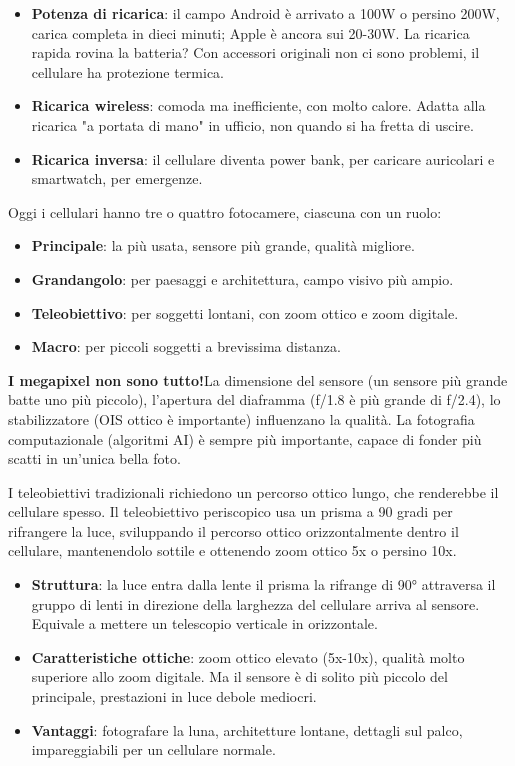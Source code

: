 \begin{itemize}
  \item \textbf{Potenza di ricarica}: il campo Android è arrivato a 100W o persino 200W, carica completa in dieci minuti; Apple è ancora sui 20-30W. La ricarica rapida rovina la batteria? Con accessori originali non ci sono problemi, il cellulare ha protezione termica.
  \item \textbf{Ricarica wireless}: comoda ma inefficiente, con molto calore. Adatta alla ricarica "a portata di mano" in ufficio, non quando si ha fretta di uscire.
  \item \textbf{Ricarica inversa}: il cellulare diventa power bank, per caricare auricolari e smartwatch, per emergenze.
\end{itemize}


Oggi i cellulari hanno tre o quattro fotocamere, ciascuna con un ruolo:

\begin{itemize}
  \item \textbf{Principale}: la più usata, sensore più grande, qualità migliore.
  \item \textbf{Grandangolo}: per paesaggi e architettura, campo visivo più ampio.
  \item \textbf{Teleobiettivo}: per soggetti lontani, con zoom ottico e zoom digitale.
  \item \textbf{Macro}: per piccoli soggetti a brevissima distanza.
\end{itemize}

\textbf{I megapixel non sono tutto!}La dimensione del sensore (un sensore più grande batte uno più piccolo), l'apertura del diaframma (f/1.8 è più grande di f/2.4), lo stabilizzatore (OIS ottico è importante) influenzano la qualità. La fotografia computazionale (algoritmi AI) è sempre più importante, capace di fonder più scatti in un'unica bella foto.


I teleobiettivi tradizionali richiedono un percorso ottico lungo, che renderebbe il cellulare spesso. Il teleobiettivo periscopico usa un prisma a 90 gradi per rifrangere la luce, sviluppando il percorso ottico orizzontalmente dentro il cellulare, mantenendolo sottile e ottenendo zoom ottico 5x o persino 10x.

\begin{itemize}
  \item \textbf{Struttura}: la luce entra dalla lente il prisma la rifrange di 90° attraversa il gruppo di lenti in direzione della larghezza del cellulare arriva al sensore. Equivale a mettere un telescopio verticale in orizzontale.
  \item \textbf{Caratteristiche ottiche}: zoom ottico elevato (5x-10x), qualità molto superiore allo zoom digitale. Ma il sensore è di solito più piccolo del principale, prestazioni in luce debole mediocri.
  \item \textbf{Vantaggi}: fotografare la luna, architetture lontane, dettagli sul palco, impareggiabili per un cellulare normale.
\end{itemize}


